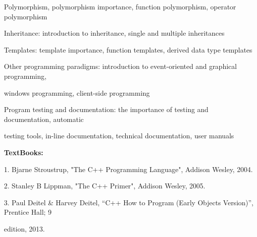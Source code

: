 \documentclass[12pt,a4paper]{article}
\begin{document}
Polymorphism, polymorphism importance, function polymorphism, operator polymorphism\par
Inheritance: introduction to inheritance, single and multiple inheritances\par
Templates: template importance, function templates, derived data type templates\par
Other programming paradigms: introduction to event-oriented and graphical programming,\par
windows programming, client-side programming\par
Program testing and documentation: the importance of testing and documentation, automatic\par
testing tools, in-line documentation, technical documentation, user manuals\par\vspace{4pt}
\textbf{TextBooks:}\par\vspace{2pt}
1. Bjarne Stroustrup, "The C++ Programming Language", Addison Wesley, 2004.\par
2. Stanley B Lippman, "The C++ Primer", Addison Wesley, 2005.\par
3. Paul Deitel \& Harvey Deitel, “C++ How to Program (Early Objects Version)”, Prentice Hall; 9\par
edition, 2013.\par
\vspace{4pt}
\end{document}
